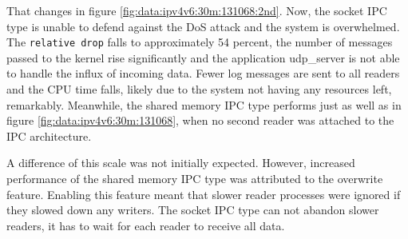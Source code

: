 That changes in figure \ref{fig:data:ipv4v6:30m:131068:2nd}.
Now, the socket IPC type is unable to defend against the DoS attack and the system is overwhelmed.
The \texttt{relative drop} falls to approximately 54 percent, the number of messages passed to the kernel rise significantly and the application udp\_server is not able to handle the influx of incoming data.
Fewer log messages are sent to all readers and the CPU time falls, likely due to the system not having any resources left, remarkably.
Meanwhile, the shared memory IPC type performs just as well as in figure \ref{fig:data:ipv4v6:30m:131068}, when no second reader was attached to the IPC architecture.

A difference of this scale was not initially expected.
However, increased performance of the shared memory IPC type was attributed to the overwrite feature.
Enabling this feature meant that slower reader processes were ignored if they slowed down any writers.
The socket IPC type can not abandon slower readers, it has to wait for each reader to receive all data.


